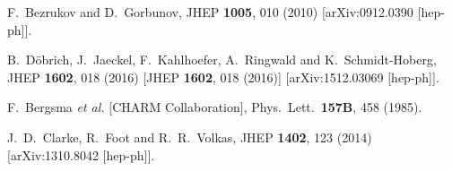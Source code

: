 \documentclass[preprint,prd,aps,tighten,nofootinbib,amssymb]{revtex4}
\begin{document}
\begin{thebibliography}{99}
  F.~Bezrukov and D.~Gorbunov,
  JHEP {\bf 1005}, 010 (2010)
  [arXiv:0912.0390 [hep-ph]].
  
  B.~Döbrich, J.~Jaeckel, F.~Kahlhoefer, A.~Ringwald and K.~Schmidt-Hoberg,
  JHEP {\bf 1602}, 018 (2016)
  [JHEP {\bf 1602}, 018 (2016)]
  [arXiv:1512.03069 [hep-ph]].
  
  F.~Bergsma {\it et al.} [CHARM Collaboration],
  Phys.\ Lett.\  {\bf 157B}, 458 (1985).
  
  J.~D.~Clarke, R.~Foot and R.~R.~Volkas,
  JHEP {\bf 1402}, 123 (2014)
  [arXiv:1310.8042 [hep-ph]].
    
  
\end{thebibliography}
\end{document}
